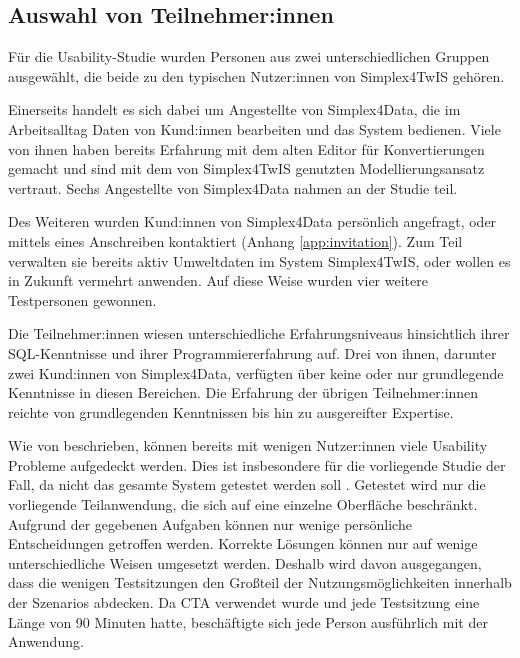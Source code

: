 \subsection{Auswahl von Teilnehmer:innen}

Für die Usability-Studie wurden Personen aus zwei unterschiedlichen Gruppen ausgewählt, die beide zu den typischen Nutzer:innen von Simplex4TwIS gehören.

Einerseits handelt es sich dabei um Angestellte von Simplex4Data, die im Arbeitsalltag Daten von Kund:innen bearbeiten und das System bedienen. Viele von ihnen haben bereits Erfahrung mit dem alten Editor für Konvertierungen gemacht und sind mit dem von Simplex4TwIS genutzten Modellierungsansatz vertraut. Sechs Angestellte von Simplex4Data nahmen an der Studie teil.

Des Weiteren wurden Kund:innen von Simplex4Data persönlich angefragt, oder mittels eines Anschreiben kontaktiert (Anhang \ref{app:invitation}). Zum Teil verwalten sie bereits aktiv Umweltdaten im System Simplex4TwIS, oder wollen es in Zukunft vermehrt anwenden. Auf diese Weise wurden vier weitere Testpersonen gewonnen.

Die Teilnehmer:innen wiesen unterschiedliche Erfahrungsniveaus hinsichtlich ihrer \ac{SQL}-Kenntnisse und ihrer Programmiererfahrung auf. Drei von ihnen, darunter zwei Kund:innen von Simplex4Data, verfügten über keine oder nur grundlegende Kenntnisse in diesen Bereichen. Die Erfahrung der übrigen Teilnehmer:innen reichte von grundlegenden Kenntnissen bis hin zu ausgereifter Expertise.

Wie von \textcite{nielsenWhyYou2000} beschrieben, können bereits mit wenigen Nutzer:innen viele Usability Probleme aufgedeckt werden. Dies ist insbesondere für die vorliegende Studie der Fall, da nicht das gesamte System getestet werden soll \parencite[Vgl. \ref{sec:formative-summative}]{spoolTestingWeb2001}. Getestet wird nur die vorliegende Teilanwendung, die sich auf eine einzelne Oberfläche beschränkt. Aufgrund der gegebenen Aufgaben können nur wenige persönliche Entscheidungen getroffen werden. Korrekte Lösungen können nur auf wenige unterschiedliche Weisen umgesetzt werden. Deshalb wird davon ausgegangen, dass die wenigen Testsitzungen den Großteil der Nutzungsmöglichkeiten innerhalb der Szenarios abdecken. Da \ac{CTA} verwendet wurde und jede Testsitzung eine Länge von 90 Minuten hatte, beschäftigte sich jede Person ausführlich mit der Anwendung.
